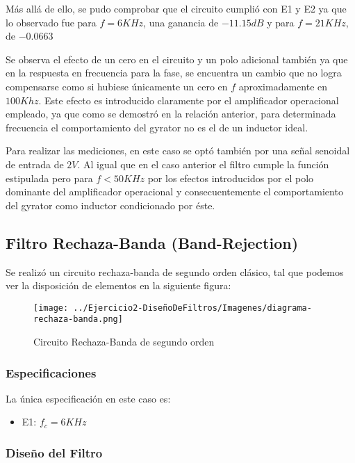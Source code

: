 Más allá de ello, se pudo comprobar que el circuito cumplió con E1 y E2 ya que lo observado fue para $f=6KHz$, una ganancia
de $-11.15 dB$ y para $f=21 KHz$, de $-0.0663$

Se observa el efecto de un cero en el circuito y un polo adicional también ya que en la respuesta en frecuencia para la fase,
se encuentra un cambio que no logra compensarse como si hubiese únicamente un cero en $f$ aproximadamente en $100 Khz$.
Este efecto es introducido claramente por el amplificador operacional empleado, ya que como se demostró en la relación anterior,
para determinada frecuencia el comportamiento del gyrator no es el de un inductor ideal.

Para realizar las mediciones, en este caso se optó también por una señal senoidal de entrada de $2V$. Al igual que en el caso anterior
el filtro cumple la función estipulada pero para $f < 50 KHz$ por los efectos introducidos por el polo dominante del amplificador operacional
y consecuentemente el comportamiento del gyrator como inductor condicionado por éste.

\subsection{Filtro Rechaza-Banda (Band-Rejection)}

Se realizó un circuito rechaza-banda de segundo orden clásico, tal que podemos
ver la disposición de elementos en la siguiente figura:

\begin{figure}[H]
    \centering
    \texttt{[image: ../Ejercicio2-DiseñoDeFiltros/Imagenes/diagrama-rechaza-banda.png]}
    \caption{Circuito Rechaza-Banda de segundo orden}
\end{figure}

\subsubsection{Especificaciones}

La única especificación en este caso es:

\begin{itemize}
	\item E1: $f_c=6 KHz$
\end{itemize}

\subsubsection{Diseño del Filtro}

